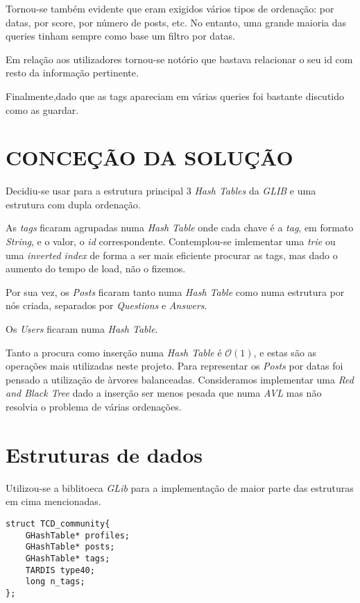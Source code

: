 \documentclass[letterpaper, 10 pt, conference]{IEEEtran}  %
\begin{document}
Tornou-se também evidente que eram exigidos vários tipos de ordenação: por datas, por score, por número de posts, etc.  No entanto, uma grande maioria das queries tinham sempre como base um filtro por datas.

Em relação aos utilizadores tornou-se notório que bastava relacionar o seu id com resto da informação pertinente.

Finalmente,dado que as tags apareciam em várias queries foi bastante discutido como as guardar.

\section{CONCEÇÃO DA SOLUÇÃO}

Decidiu-se usar para a estrutura principal 3 \textit{Hash Tables} da \textit{GLIB} e uma estrutura com dupla ordenação.

As \textit{tags} ficaram agrupadas numa \textit{Hash Table} onde cada chave é a \textit{tag}, em formato \textit{String}, e o valor,  o \textit{id} correspondente.
Contemplou-se imlementar uma \textit{trie} ou uma \textit{inverted index} de forma a ser mais eficiente procurar as tags, mas dado o aumento do tempo de load, não o fizemos.

Por sua vez, os \textit{Posts} ficaram tanto numa \textit{Hash Table} como numa estrutura por nós criada, separados por \textit{Questions} e \textit{Answers}.

Os \textit{Users} ficaram numa \textit{Hash Table}.

Tanto a procura como inserção numa \textit{Hash Table} é $\mathcal{O}(1)$, e estas são as operações mais utilizadas neste projeto.
Para representar os \textit{Posts} por datas foi pensado a utilização de àrvores balanceadas. Consideramos implementar uma \textit{Red and Black Tree} dado a inserção ser menos pesada que numa \textit{AVL} mas não resolvia o problema de várias ordenações.

\section{Estruturas de dados}

Utilizou-se a biblitoeca \textit{GLib} para a implementação de maior parte das estruturas em cima mencionadas.
\begin{lstlisting}
struct TCD_community{
    GHashTable* profiles;
    GHashTable* posts;
    GHashTable* tags;
    TARDIS type40;
    long n_tags;
};
\end{lstlisting}
\end{document}
